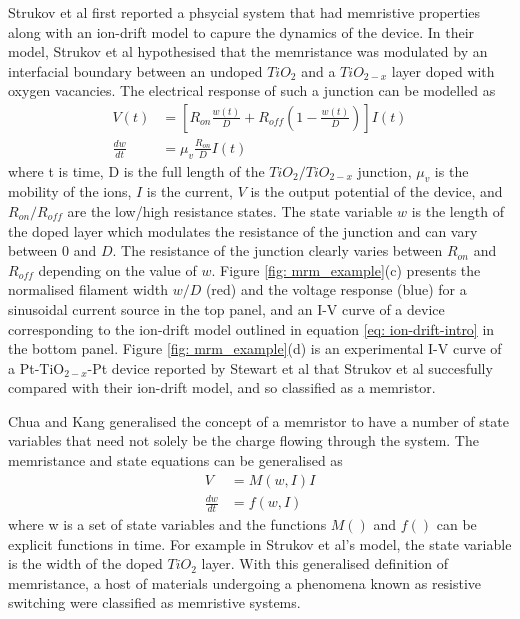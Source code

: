 Strukov et al\cite{strukov2008} first reported a phsycial system that had memristive properties along with an ion-drift model to capure the dynamics of the device. In their model, Strukov et al hypothesised that the memristance was modulated by an interfacial boundary between an undoped $TiO_2$ and a $TiO_{2-x}$ layer doped with oxygen vacancies. The electrical response of such a junction can be modelled as
\begin{align}
V(t) & = \left[ R_{on} \frac{w(t)}{D} + R_{off} \left( 1 - \frac{w(t)}{D} \right) \right] I(t) \nonumber \\
\frac{dw}{dt} & = \mu_v\frac{R_{on}}{D} I(t) 
\label{eq: ion-drift-intro}
\end{align}
where t is time, D is the full length of the $TiO_2/TiO_{2-x}$ junction, $\mu_v$ is the mobility of the ions, $I$ is the current, $V$ is the output potential of the device, and $R_{on}/R_{off}$ are the low/high resistance states. The state variable $w$ is the length of the doped layer which modulates the resistance of the junction and can vary between $0$ and $D$. The resistance of the junction clearly varies between $R_{on}$ and $R_{off}$ depending on the value of $w$. Figure \ref{fig: mrm_example}(c) presents the normalised filament width $w/D$ (red) and the voltage response (blue) for a sinusoidal current source in the top panel, and an I-V curve of a device corresponding to the ion-drift model outlined in equation \ref{eq: ion-drift-intro} in the bottom panel. Figure \ref{fig: mrm_example}(d) is an experimental I-V curve of a Pt-TiO$_{2-x}$-Pt device reported by Stewart et al\cite{stewart2004} that Strukov et al succesfully compared with their ion-drift model, and so classified as a memristor\cite{strukov2008}. 

Chua and Kang generalised the concept of a memristor to have a number of state variables that need not solely be the charge flowing through the system. The memristance and state equations can be generalised as
\begin{align}
V & = M(w,I)I\\
\frac{dw}{dt} & = f(w,I) 
\end{align}  
where w is a set of state variables and the functions $M()$ and $f()$ can be explicit functions in time\cite{chua1976}. For example in Strukov et al's model, the state variable is the width of the doped $TiO_2$ layer. With this generalised definition of memristance, a host of materials undergoing a phenomena known as resistive switching\cite{pan2014,yang2013,valov2013} were classified as memristive systems\cite{chua2011}. 


